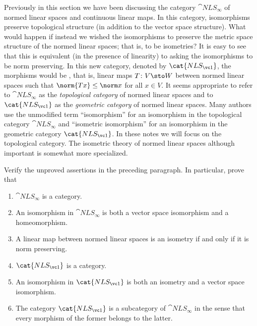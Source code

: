 Previously in this section we have been discussing the category $\cat{NLS_{\boldsymbol\infty}}$ of normed
linear spaces and continuous linear maps.  In this category, isomorphisms preserve topological structure
(in addition to the vector space structure).  What would happen if instead we wished the isomorphisms to
preserve the metric space structure of the normed linear spaces; that is, to be isometries?  It is easy to
see that this is equivalent (in the presence of linearity) to asking the isomorphisms to be norm preserving.
In this new category, denoted by
$\cat{NLS_{\vc 1}}$, the morphisms would be
, that is, linear maps $T\colon V \sto W$ between normed
linear spaces such that $\norm{Tx} \le \norm x$ for all $x \in V$.  It seems appropriate
to refer to $\cat{NLS_{\boldsymbol\infty}}$ as the
\emph{topological category} of normed linear spaces and to $\cat{NLS_{\vc 1}}$ as the
\emph{geometric category} of normed linear spaces.  Many authors use the unmodified term
``isomorphism'' for an isomorphism in the topological category
$\cat{NLS_{\boldsymbol\infty}}$ and
``isometric isomorphism'' for an isomorphism in the geometric category $\cat{NLS_{\vc 1}}$. In these notes
we will focus on the topological category.  The isometric theory of normed linear spaces although important
is somewhat more specialized.

\begin{exer} Verify the unproved assertions in the preceding paragraph.  In particular, prove that
 \begin{enumerate}
    \item[(a)] $\cat{NLS_{\boldsymbol\infty}}$ is a category.
    \item[(b)] An isomorphism in $\cat{NLS_{\boldsymbol\infty}}$ is both a vector space isomorphism and a homeomorphism.
    \item[(c)] A linear map between normed linear spaces is an isometry if and only if it is norm preserving.
    \item[(d)] $\cat{NLS_{\vc 1}}$ is a category.
    \item[(e)] An isomorphism in $\cat{NLS_{\vc 1}}$ is both an isometry and a vector space isomorphism.
    \item[(f)] The category $\cat{NLS_{\vc 1}}$ is a subcategory of $\cat{NLS_{\boldsymbol\infty}}$
in the sense that every morphism of the former belongs to the latter.
 \end{enumerate}
\end{exer}
















